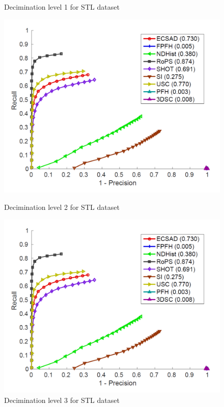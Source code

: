 \documentclass[10pt,twocolumn,letterpaper]{article}
\begin{document}
\begin{figure}[htp]
\begin{minipage}[b]{.3\textwidth}
\caption{Decimination level 1 for STL dataset}\label{fig:stl_d1}
\end{minipage}\qquad
\begin{minipage}[b]{.3\textwidth}
\includegraphics[width=1.0\linewidth, height= 1.0\linewidth, keepaspectratio]{img/PRC_1.pdf}
\caption{Decimination level 2 for STL dataset}\label{fig:stl_d2}
\end{minipage}
\begin{minipage}[b]{.3\textwidth}
\includegraphics[width=1.0\linewidth, height= 1.0\linewidth, keepaspectratio]{img/PRC_1.pdf}
\caption{Decimination level 3 for STL dataset}\label{fig:stl_d3}
\end{minipage}
\end{figure}
\end{document}
